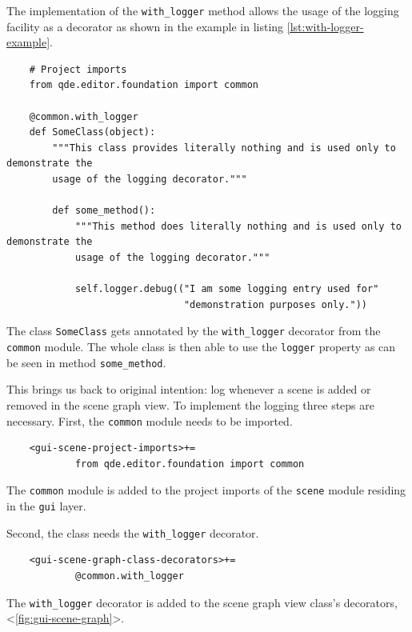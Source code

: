 \documentclass[10pt, openright, notitlepage]{scrreprt}
\begin{document}
The implementation of the \texttt{with\_logger} method allows the usage of the
logging facility as a decorator as shown in the example in listing
\ref{lst:with-logger-example}.

\begin{listing}[H]
\begin{verbatim}
    # Project imports
    from qde.editor.foundation import common
    
    @common.with_logger
    def SomeClass(object):
        """This class provides literally nothing and is used only to demonstrate the
        usage of the logging decorator."""
    
        def some_method():
            """This method does literally nothing and is used only to demonstrate the
            usage of the logging decorator."""
    
            self.logger.debug(("I am some logging entry used for"
                               "demonstration purposes only."))
\end{verbatim}
\caption{\label{lst:with-logger-example}
The class \texttt{SomeClass} gets annotated by the \texttt{with\_logger} decorator from the \texttt{common} module. The whole class is then able to use the \texttt{logger} property as can be seen in method \texttt{some\_method}.}
\end{listing}

This brings us back to original intention: log whenever a scene is added or
removed in the scene graph view. To implement the logging three steps are
necessary. First, the \texttt{common} module needs to be imported.

\begin{listing}[H]
\begin{verbatim}
    <gui-scene-project-imports>+=
            from qde.editor.foundation import common
\end{verbatim}
\caption{\label{lst:gui-scene-project-imports-02}
The \texttt{common} module is added to the project imports of the \texttt{scene} module residing in the \texttt{gui} layer.}
\end{listing}

Second, the class needs the \texttt{with\_logger} decorator.

\begin{listing}[H]
\begin{verbatim}
    <gui-scene-graph-class-decorators>+=
            @common.with_logger
\end{verbatim}
\caption{\label{lst:gui-scene-graph-class-decorators-01}
The \texttt{with\_logger} decorator is added to the scene graph view class's decorators, <\ref{fig:gui-scene-graph}>.}
\end{listing}
\end{document}
